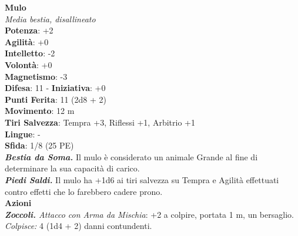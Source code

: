 \begin{multicols}{2}
\medskip\textbf{Mulo}\\
\emph{Media bestia, disallineato}\\
\textbf{Potenza}: +2\\
\textbf{Agilità}: +0\\
\textbf{Intelletto}: -2\\
\textbf{Volontà}: +0\\
\textbf{Magnetismo}: -3\\
\textbf{Difesa}: 11 - \textbf{Iniziativa}: +0\\
\textbf{Punti Ferita}: 11 (2d8 + 2)\\
\textbf{Movimento}: 12 m\\
\textbf{Tiri Salvezza}: Tempra +3, Riflessi +1, Arbitrio +1 \\
\textbf{Lingue}: -\\
\textbf{Sfida}: 1/8 (25 PE)\smallskip\\
\emph{\textbf{Bestia da Soma.}} Il mulo è considerato un animale Grande al fine di determinare la sua capacità di carico.\\
\emph{\textbf{Piedi Saldi.}} Il mulo ha +1d6 ai tiri salvezza su Tempra e Agilità effettuati contro effetti che lo farebbero cadere prono.\\
\smallskip\textbf{Azioni}\\
\emph{\textbf{Zoccoli.} Attacco con Arma da Mischia}: +2 a colpire, portata 1 m, un bersaglio.\\
\emph{Colpisce:} 4 (1d4 + 2) danni contundenti.\\



\end{multicols}
